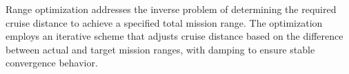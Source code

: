 
Range optimization addresses the inverse problem of determining the required cruise distance to achieve a specified total mission range. The optimization employs an iterative scheme that adjusts cruise distance based on the difference between actual and target mission ranges, with damping to ensure stable convergence behavior.
